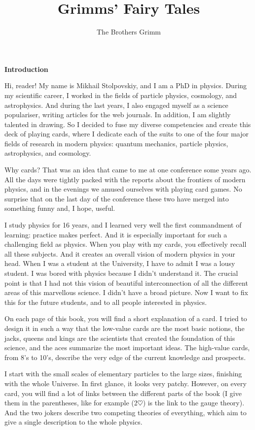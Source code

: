 \documentclass[]{bookest}
\title{Grimms' Fairy Tales} %
\author{The Brothers Grimm} %
\begin{document}
{\huge{\textbf{Introduction}}}
\vskip12pt

Hi, reader! My name is Mikhail Stolpovskiy, and I am a PhD in physics. During my scientific career, I worked in the fields of particle physics, cosmology, and astrophysics. And during the last  years, I also engaged myself as a science populariser, writing articles for the web journals. In addition, I am slightly talented in drawing. So I decided to fuse  my diverse competencies and create this deck of playing cards, where I dedicate each of the suits to one of the four major fields of research in modern physics: quantum mechanics, particle physics, astrophysics, and cosmology.

Why cards? That was an idea that came to me at one conference some years ago. All the days were tightly packed with the reports about the frontiers of  modern physics, and in the evenings we amused ourselves with playing card games. No surprise that on the last day of the conference these two have merged into something funny and, I hope, useful.

I study physics for 16 years, and I learned very well the first commandment of learning: practice makes perfect. And it is especially important for such a challenging field as physics. When you play with my cards, you effectively recall all these subjects. And it creates an overall vision of modern physics in your head. When I was a student at the University, I have to admit I was a lousy student. I was bored with physics because I didn't understand it. The crucial point is that I had not this vision of beautiful interconnection of all the different areas of this marvellous science. I didn't have a broad picture. Now I want to fix this for the future students, and to all people interested in physics.

On each page of this book, you will find a short explanation of a card. I tried to design it in such a way that the low-value cards are the most basic notions, the jacks, queens and kings are the scientists that created the foundation of this science, and the aces summarize the most important ideas. The high-value cards, from 8's to 10's, describe the very edge of the current knowledge and prospects.

I start with the small scales of elementary particles to the large sizes, finishing with the whole Universe. In first glance, it looks very patchy. However, on every card, you will find a lot of links between the different parts of the book (I give them in the parentheses, like for example (2$\heartsuit$) is the link to the gauge theory). And the two jokers describe two competing theories of everything, which aim to give a single description to the whole physics.
\end{document}
